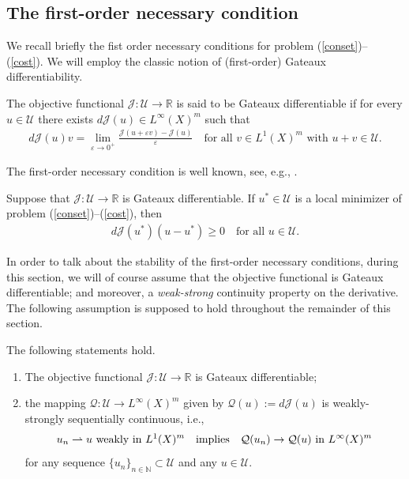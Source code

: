 \documentclass[hidelinks,onefignum,onetabnum]{siamart220329}
\begin{document}
\subsection{The first-order necessary condition}
We recall briefly the fist order necessary conditions for problem (\ref{conset})--(\ref{cost}).
We will employ the classic notion of (first-order) Gateaux differentiability.
\begin{definition}\label{Gatdiff}
The objective functional ${\mathcal J}:\mathcal U\to\mathbb R$ is said to be  Gateaux differentiable if for every $u\in\mathcal U$ there exists $d\mathcal J(u)\in L^\infty(X)^m$ such that
	\begin{align*}
	d{\mathcal J}(u)v=\lim_{\varepsilon\to0^+}\frac{{\mathcal J}(u+\varepsilon v)-{\mathcal J}(u)}{\varepsilon}\quad\text{for all $v\in L^1(X)^m$ with $u+v\in\mathcal U$.}
	\end{align*}
\end{definition}
	The first-order necessary condition is well known, see, e.g.,  \cite[pp. 11-13]{LecVar}.
\begin{lemma}\label{Fonc}
	Suppose that $\mathcal J:\mathcal U\to\mathbb R$ is Gateaux differentiable. If $u^*\in\mathcal U$ is a local minimizer of problem (\ref{conset})--(\ref{cost}), then
	\begin{align}\label{Necconever0}
		d\mathcal J(u^*)(u-u^*)\ge0\quad\text{for all $u\in\mathcal U$.}
	\end{align}
\end{lemma}


In order to talk about the stability of the first-order necessary conditions, during this section, we will of course assume that the objective functional is Gateaux differentiable; and moreover, a  \textit{weak-strong} continuity property on the derivative. The following assumption is supposed to hold throughout the remainder of this section.
\begin{assumption}\label{A2}
	The following statements hold.
	\begin{enumerate}
		\item The objective functional  $\mathcal J:\mathcal U\to\mathbb R$ is Gateaux differentiable;
		
		\item the mapping $\mathcal Q:\mathcal U\to L^\infty(X)^m$ given by $\mathcal Q(u):=d\mathcal J(u)$ is weakly-strongly sequentially continuous,
			i.e.,
			\begin{align*}
				\text{$u_n \rightharpoonup u$ weakly in $L^1(X)^m$\,\,\,\, implies\,\,\,\,	$\mathcal Q(u_n) \to \mathcal Q(u)$ in $L^\infty(X)^m$}
			\end{align*}
			for any sequence $\{u_n\}_{n \in \mathbb N} \subset \mathcal U$ and any $u\in\mathcal U$.
	\end{enumerate}
\end{assumption}
\end{document}
